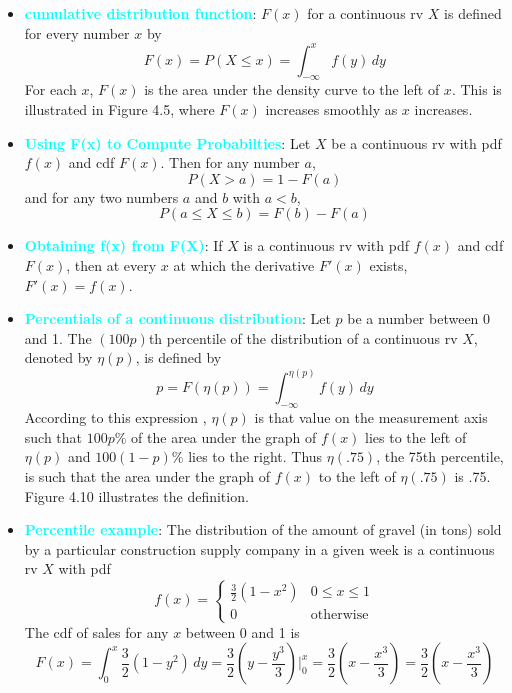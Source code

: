 \documentclass{report}
\begin{document}
\begin{itemize}
        \item \textbf{\textcolor{cyan}{cumulative distribution function}}: $F(x)$ for a continuous rv $X$ is defined for every number $x$ by
            \[
                F(x) = P(X \leq x) = \int_{-\infty}^{x} f(y) \, dy
            \]
        For each $x$, $F(x)$ is the area under the density curve to the left of $x$. This is illustrated in Figure 4.5, where $F(x)$ increases smoothly as $x$ increases.
    \item \textbf{\textcolor{cyan}{Using F(x) to Compute Probabilties}}:
        Let $X$ be a continuous rv with pdf $f(x)$ and cdf $F(x)$. Then for any number $a$,
        \[
            P(X > a) = 1 - F(a)
        \]
        and for any two numbers $a$ and $b$ with $a < b$,
        \[
            P(a \leq X \leq b) = F(b) - F(a)
        \]
    \item \textbf{\textcolor{cyan}{Obtaining f(x) from F(X)}}:
        If $X$ is a continuous rv with pdf $f(x)$ and cdf $F(x)$, then at every $x$ at which the derivative $F'(x)$ exists, $F'(x) = f(x)$.
    \item \textbf{\textcolor{cyan}{Percentials of a continuous distribution}}:
        Let $p$ be a number between 0 and 1. The $(100p)$th percentile of the distribution of a continuous rv $X$, denoted by $\eta(p)$, is defined by
        \[
            p = F(\eta(p)) = \int_{-\infty}^{\eta(p)} f(y) \, dy
        \]
        \bigbreak \noindent 
        According to this expression , $\eta(p)$ is that value on the measurement axis such that $100p\%$ of the area under the graph of $f(x)$ lies to the left of $\eta(p)$ and $100(1 - p)\%$ lies to the right. Thus $\eta(.75)$, the 75th percentile, is such that the area under the graph of $f(x)$ to the left of $\eta(.75)$ is .75. Figure 4.10 illustrates the definition.
        \bigbreak \noindent 
    \item \textbf{\textcolor{cyan}{Percentile example}}:
        The distribution of the amount of gravel (in tons) sold by a particular construction supply company in a given week is a continuous rv $X$ with pdf
        \[
            f(x) = 
            \begin{cases} 
                \frac{3}{2} (1 - x^2) & 0 \leq x \leq 1 \\ 
                0 & \text{otherwise} 
            \end{cases}
        \]
        The cdf of sales for any $x$ between 0 and 1 is
        \[
            F(x) = \int_{0}^{x} \frac{3}{2} (1 - y^2) \, dy = \frac{3}{2} \left( y - \frac{y^3}{3} \right) \bigg|_{0}^{x} = \frac{3}{2} \left( x - \frac{x^3}{3} \right) = \frac{3}{2} \left( x - \frac{x^3}{3} \right)
\]
\end{itemize}
\end{document}
